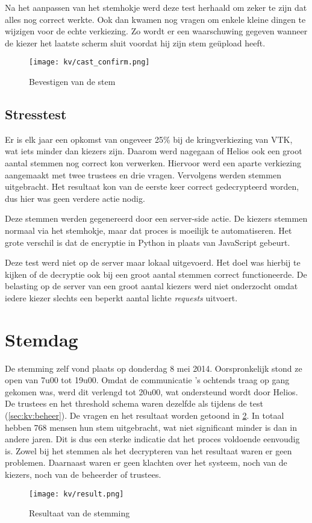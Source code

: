 \npar Na het aanpassen van het stemhokje werd deze test herhaald om zeker te zijn dat alles nog correct werkte. Ook dan kwamen nog vragen om enkele kleine dingen te wijzigen voor de echte verkiezing. Zo wordt er een waarschuwing gegeven wanneer de kiezer het laatste scherm sluit voordat hij zijn stem ge\"upload heeft.

\begin{figure}
  \centering
  \texttt{[image: kv/cast\_confirm.png]}
  \caption{Bevestigen van de stem}
  \label{fig:kv:cast_confirm}
\end{figure}

\subsection{Stresstest}

Er is elk jaar een opkomst van ongeveer 25\% bij de kringverkiezing van VTK, wat iets minder dan  kiezers zijn. Daarom werd nagegaan of Helios ook een groot aantal stemmen nog correct kon verwerken. Hiervoor werd een aparte verkiezing aangemaakt met twee trustees en drie vragen. Vervolgens werden  stemmen uitgebracht. Het resultaat kon van de eerste keer correct gedecrypteerd worden, dus hier was geen verdere actie nodig.

\npar Deze stemmen werden gegenereerd door een server-side actie. De kiezers stemmen normaal via het stemhokje, maar dat proces is moeilijk te automatiseren. Het grote verschil is dat de encryptie in Python in plaats van JavaScript gebeurt.

\npar Deze test werd niet op de server maar lokaal uitgevoerd. Het doel was hierbij te kijken of de  decryptie ook bij een groot aantal stemmen correct functioneerde. De belasting op de server van een groot aantal kiezers werd niet onderzocht omdat iedere kiezer slechts een beperkt aantal lichte \textit{requests} uitvoert.

\section{Stemdag}
\label{sec:kv:stemdag}

\npar De stemming zelf vond plaats op donderdag 8 mei 2014. Oorspronkelijk stond ze open van 7u00 tot 19u00. Omdat de communicatie 's ochtends traag op gang gekomen was, werd dit verlengd tot 20u00, wat ondersteund wordt door Helios. De trustees en het threshold schema waren dezelfde als tijdens de test (\ref{sec:kv:beheer}). De vragen en het resultaat worden getoond in \ref{fig:kv:result}. In totaal hebben 768 mensen hun stem uitgebracht, wat niet significant minder is dan in andere jaren. Dit is dus een sterke indicatie dat het proces voldoende eenvoudig is. Zowel bij het stemmen als het decrypteren van het resultaat waren er geen problemen. Daarnaast waren er geen klachten over het systeem, noch van de kiezers, noch van de beheerder of trustees.

\begin{figure}
  \centering
  \texttt{[image: kv/result.png]}
  \caption{Resultaat van de stemming}
  \label{fig:kv:result}
\end{figure}
